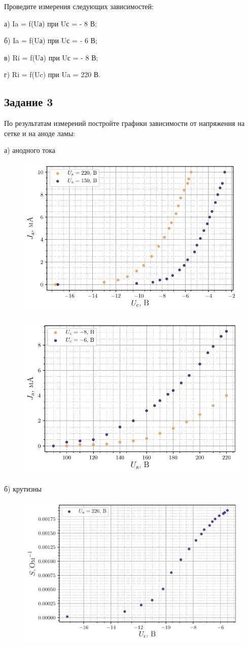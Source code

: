 Проведите измерения следующих зависимостей:

а) Ia = f(Uа) при Uс = - 8 В;

б) Ia = f(Uа) при Uс = - 6 В;

в) Ri = f(Uа) при Uс = - 8 В;

г) Ri = f(Uc) при Ua = 220 В.

\subsection{Задание 3}
По результатам измерений постройте графики зависимости от напряжения на сетке и на 
аноде ламы:

\newpage
а) анодного тока
\begin{figure}[h!]
	\centering
    \includegraphics[width=0.7\linewidth]{scripts/fig1}
	\caption{}
	\label{fig:10}
\end{figure}

\begin{figure}[h!]
	\centering
    \includegraphics[width=0.7\linewidth]{scripts/fig4}
	\caption{}
	\label{fig:10}
\end{figure}

\newpage
б) крутизны
\begin{figure}[h!]
	\centering
    \includegraphics[width=0.7\linewidth]{scripts/fig2}
	\caption{}
	\label{fig:10}
\end{figure}

